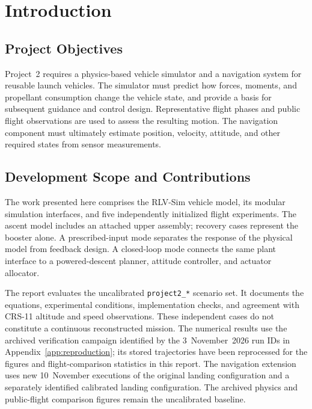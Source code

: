 \documentclass[11pt,letterpaper]{article}
\newcommand{\code}[1]{\texttt{#1}}
\begin{document}
\section{Introduction}
\subsection{Project Objectives}
Project~2 requires a physics-based vehicle simulator and a navigation system for reusable launch vehicles. The simulator must predict how forces, moments, and propellant consumption change the vehicle state, and provide a basis for subsequent guidance and control design. Representative flight phases and public flight observations are used to assess the resulting motion. The navigation component must ultimately estimate position, velocity, attitude, and other required states from sensor measurements.

\subsection{Development Scope and Contributions}
The work presented here comprises the RLV-Sim vehicle model, its modular simulation interfaces, and five independently initialized flight experiments. The ascent model includes an attached upper assembly; recovery cases represent the booster alone. A prescribed-input mode separates the response of the physical model from feedback design. A closed-loop mode connects the same plant interface to a powered-descent planner, attitude controller, and actuator allocator.

The report evaluates the uncalibrated \code{project2\_*} scenario set. It documents the equations, experimental conditions, implementation checks, and agreement with CRS-11 altitude and speed observations. These independent cases do not constitute a continuous reconstructed mission. The numerical results use the archived verification campaign identified by the 3~November~2026 run IDs in Appendix~\ref{app:reproduction}; its stored trajectories have been reprocessed for the figures and flight-comparison statistics in this report. The navigation extension uses new 10~November executions of the original landing configuration and a separately identified calibrated landing configuration. The archived physics and public-flight comparison figures remain the uncalibrated baseline.
\end{document}
